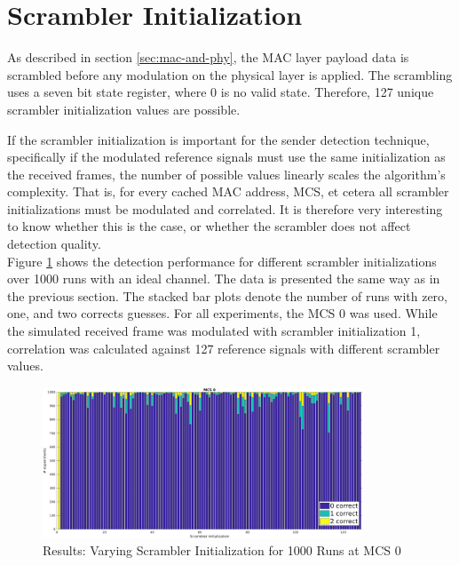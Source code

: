 
\section{Scrambler Initialization}\label{sec:ex-scrambler}

As described in section \ref{sec:mac-and-phy}, the \gls{MAC} layer payload data is scrambled before any modulation on the physical layer is applied. The scrambling uses a seven bit state register, where 0 is no valid state. Therefore, 127 unique scrambler initialization values are possible.

If the scrambler initialization is important for the sender detection technique, specifically if the modulated reference signals must use the same initialization as the received frames, the number of possible values linearly scales the algorithm's complexity. That is, for every cached \gls{MAC} address, \gls{MCS}, et cetera all scrambler initializations must be modulated and correlated. It is therefore very interesting to know whether this is the case, or whether the scrambler does not affect detection quality.\\

Figure \ref{fig:vary_scrambler} shows the detection performance for different scrambler initializations over 1000 runs with an ideal channel. The data is presented the same way as in the previous section. The stacked bar plots denote the number of runs with zero, one, and two corrects guesses. For all experiments, the \gls{MCS} 0 was used. While the simulated received frame was modulated with scrambler initialization 1, correlation was calculated against 127 reference signals with different scrambler values.

\begin{figure}[H]
	\centering
	\includegraphics[height=4.5cm]{gfx/plots/scrambler}
	\caption[Results: Varying Scrambler Initialization for 1000 Runs]{Results: Varying Scrambler Initialization for 1000 Runs at MCS 0}
	\label{fig:vary_scrambler}
\end{figure}

